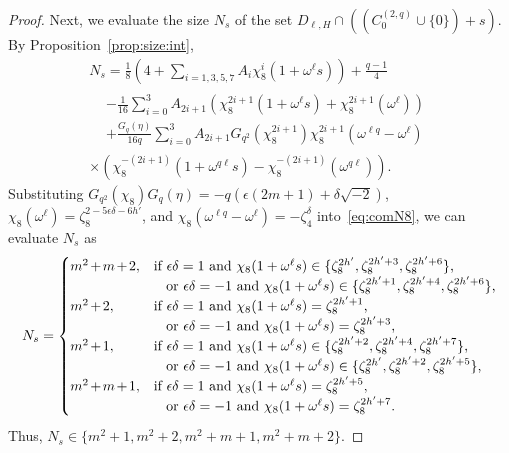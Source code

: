 \documentclass[ALCO,ThmDefs,Unicode]{cedram}
\newcommand*{\Mk}{\mkern -2mu}
\begin{document}
\begin{proof}
Next, we evaluate the size $N_s$ of the set $D_{\ell,H}\cap ((C_0^{(2,q)}\cup \{0\})+s)$. By Proposition~\ref{prop:size:int},
\begin{multline}
N_s= \frac{1}{8}\left(4+\sum_{i=1,3,5,7}A_i\chi_8^i(1+\omega^\ell s)\right)+\frac{q-1}{4}\\
\begin{aligned}
&-\frac{1}{16}\sum_{i=0}^{3} A_{2i+1}(\chi_8^{2i+1}(1+\omega^\ell s)+\chi_8^{2i+1}(\omega^\ell))\\
&+\frac{G_q(\eta)}{16q}\sum_{i=0}^{3}A_{2i+1} G_{q^2}(\chi_8^{2i+1})\chi_8^{2i+1}(\omega^{\ell q}-\omega^\ell)
\end{aligned}\\
\times (\chi_8^{-(2i+1)}(1+\omega^{q\ell} s)-\chi_8^{-(2i+1)}(\omega^{q\ell})).\label{eq:comN8}
\end{multline}
Substituting $G_{q^2}(\chi_8)G_q(\eta)=-q(\epsilon (2m+1)+\delta \sqrt{-2})$, $\chi_8(\omega^\ell)=\zeta_8^{2-5\epsilon \delta-6h'}$, and $\chi_8(\omega^{\ell q}-\omega^\ell)=-\zeta_4^{\delta}$ into~\eqref{eq:comN8}, we can evaluate $N_s$ as
\begin{equation}\label{eq:dual8}
N_s=
\begin{cases}
m^2\Mk+\Mk m\Mk+\Mk2,& \text{if $\epsilon \delta=1$ and $\chi_8(1+\omega^\ell s)\in \{\zeta_8^{2h'},\zeta_8^{2h'+3},\zeta_8^{2h'+6}\}$,}\\
& \text{\;\; or $\epsilon \delta=-1$ and $\chi_8(1+\omega^\ell s)\in \{\zeta_8^{2h'+1},\zeta_8^{2h'+4},\zeta_8^{2h'+6}\}$,}\\
m^2\Mk+\Mk 2,& \text{if $\epsilon \delta=1$ and $\chi_8(1+\omega^\ell s)= \zeta_8^{2h'+1}$,}\\
& \text{\;\; or $\epsilon \delta=-1$ and $\chi_8(1+\omega^\ell s)= \zeta_8^{2h'+3}$,}\\
m^2\Mk+\Mk 1,& \text{if $\epsilon \delta=1$ and $\chi_8(1+\omega^\ell s)\in \{\zeta_8^{2h'+2},\zeta_8^{2h'+4},\zeta_8^{2h'+7}\}$, }\\
& \text{\;\; or $\epsilon \delta=-1$ and $\chi_8(1+\omega^\ell s)\in \{\zeta_8^{2h'},\zeta_8^{2h'+2},\zeta_8^{2h'+5}\}$,}\\
m^2\Mk+\Mk m\Mk+\Mk 1,& \text{if $\epsilon \delta=1$ and $\chi_8(1+\omega^\ell s)=\zeta_8^{2h'+5}$,}\\
& \text{\;\; or $\epsilon \delta=-1$ and $\chi_8(1+\omega^\ell s)=\zeta_8^{2h'+7}$.}
\end{cases}
\end{equation}
Thus, $N_s\in \{m^2+1,m^2+2,m^2+m+1,m^2+m+2\}$.
\end{proof}
\end{document}
